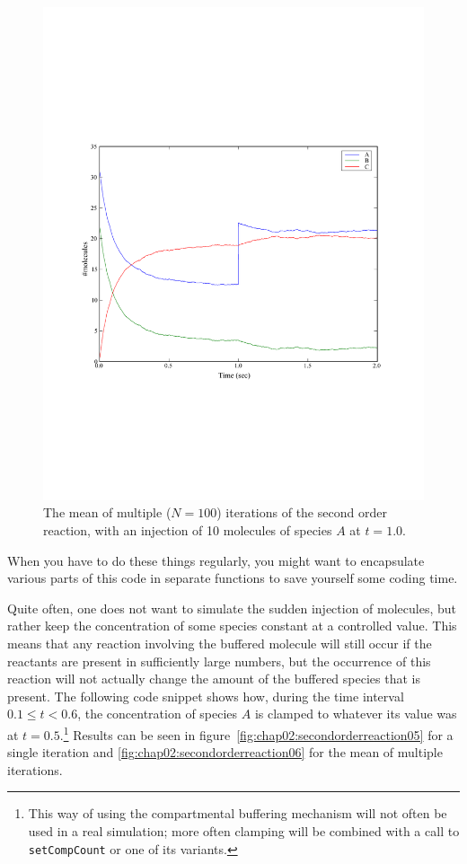 \documentclass[a4paper,12pt]{book}
\begin{document}
\begin{figure}
\centering
\includegraphics[width=13cm]{chap02_secondorderreaction04.pdf}
\caption{The mean of multiple ($N=100$) iterations of the second order reaction, with an injection of 10 molecules of species $A$ at $t=1.0$.}
\label{fig:chap02:secondorderreaction04}
\end{figure}

When you have to do these things regularly, you might want to encapsulate various parts of this code in separate functions to save yourself some coding time. 

Quite often, one does not want to simulate the sudden injection of molecules, but rather keep the concentration of some species constant at a controlled value. This means that any reaction involving the buffered molecule will still occur if the reactants are present in sufficiently large numbers, but the occurrence of this reaction will not actually change the amount of the buffered species that is present. The following code snippet shows how, during the time interval $0.1 \leq t < 0.6$, the concentration of species $A$ is clamped to whatever its value was at $t = 0.5$.\footnote{This way of using the compartmental buffering mechanism will not often be used in a real simulation; more often clamping will be combined with a call to \texttt{setCompCount} or one of its variants.} Results can be seen in figure~\ref{fig:chap02:secondorderreaction05} for a single iteration and \ref{fig:chap02:secondorderreaction06} for the mean of multiple iterations.
\end{document}
